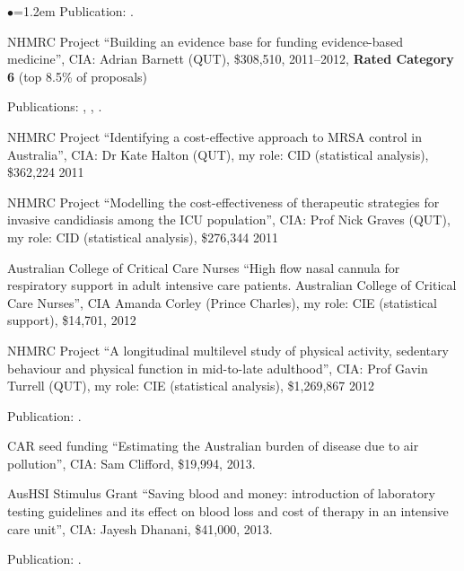 \documentclass[a4paper,11pt]{article}
\renewcommand{\labelitemi}{$\bullet$}
\begin{document}
\begin{raggedright}
\begin{list}{\labelitemi}{\leftmargin=1.2em}
    Publication: .

\item NHMRC Project ``Building an evidence base for funding evidence-based medicine'', CIA: Adrian Barnett (QUT), \$308,510, 2011--2012, \textbf{Rated Category 6} (top 8.5\% of proposals)

    Publications: , , .

\item NHMRC Project ``Identifying a cost-effective approach to MRSA control in Australia'', CIA: Dr Kate Halton (QUT), my role: CID (statistical analysis), \$362,224 2011

\item NHMRC Project ``Modelling the cost-effectiveness of therapeutic strategies for invasive candidiasis among the ICU population'', CIA: Prof Nick Graves (QUT), my role: CID (statistical analysis), \$276,344 2011

\item Australian College of Critical Care Nurses ``High flow nasal cannula for respiratory support in adult intensive care patients. Australian College of Critical Care Nurses'', CIA Amanda Corley (Prince Charles), my role: CIE (statistical support), \$14,701, 2012


\item NHMRC Project ``A longitudinal multilevel study of physical activity, sedentary behaviour and physical function in mid-to-late adulthood'', CIA: Prof Gavin Turrell (QUT), my role: CIE (statistical analysis), \$1,269,867 2012

Publication: .

\item CAR seed funding ``Estimating the Australian burden of disease due to air pollution'', CIA: Sam Clifford, \$19,994, 2013.

\item AusHSI Stimulus Grant ``Saving blood and money: introduction of laboratory testing guidelines and its effect on blood loss and cost of therapy in an intensive care unit'', CIA: Jayesh Dhanani, \$41,000, 2013.

Publication: .


\end{list}
\end{raggedright}
\end{document}
